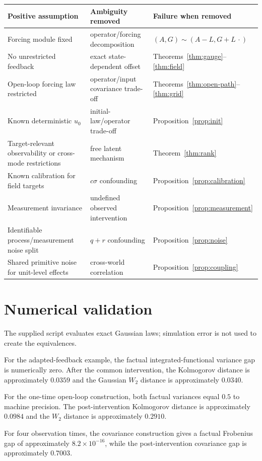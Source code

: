 \documentclass[11pt]{article}
\theoremstyle{remark}
\begin{document}
\begin{longtable}{@{}p{}p{}p{}@{}}
\toprule
Positive assumption & Ambiguity removed & Failure when removed\\
\midrule
Forcing module fixed & operator/forcing decomposition & $(A,G)\sim(A-L,G+L\,\cdot)$\\
No unrestricted feedback & exact state-dependent offset & Theorems~\ref{thm:gauge}--\ref{thm:field}\\
Open-loop forcing law restricted & operator/input covariance trade-off & Theorems~\ref{thm:open-path}--\ref{thm:grid}\\
Known deterministic $u_0$ & initial-law/operator trade-off & Proposition~\ref{prop:init}\\
Target-relevant observability or cross-mode restrictions & free latent mechanism & Theorem~\ref{thm:rank}\\
Known calibration for field targets & $c\sigma$ confounding & Proposition~\ref{prop:calibration}\\
Measurement invariance & undefined observed intervention & Proposition~\ref{prop:measurement}\\
Identifiable process/measurement noise split & $q+r$ confounding & Proposition~\ref{prop:noise}\\
Shared primitive noise for unit-level effects & cross-world correlation & Proposition~\ref{prop:coupling}\\
\bottomrule
\end{longtable}

\section{Numerical validation}

The supplied script evaluates exact Gaussian laws; simulation error is not used to create the equivalences.

For the adapted-feedback example, the factual integrated-functional variance gap is numerically zero. After the common intervention, the Kolmogorov distance is approximately $0.0359$ and the Gaussian $W_2$ distance is approximately $0.0340$.

For the one-time open-loop construction, both factual variances equal $0.5$ to machine precision. The post-intervention Kolmogorov distance is approximately $0.0984$ and the $W_2$ distance is approximately $0.2910$.

For four observation times, the covariance construction gives a factual Frobenius gap of approximately $8.2\times10^{-16}$, while the post-intervention covariance gap is approximately $0.7003$.
\end{document}
